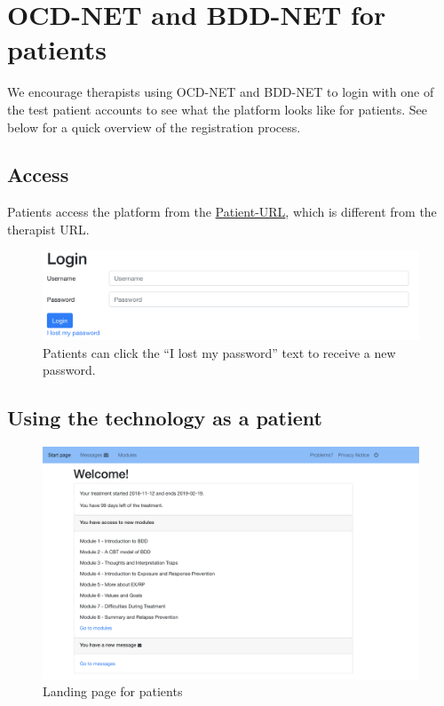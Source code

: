 \documentclass[]{book}
\theoremstyle{definition}
\theoremstyle{definition}
\theoremstyle{definition}
\theoremstyle{remark}
\begin{document}
\hypertarget{ocd-net-and-bdd-net-for-patients}{%
\section{OCD-NET and BDD-NET for
patients}\label{ocd-net-and-bdd-net-for-patients}}

We encourage therapists using OCD-NET and BDD-NET to login with one of
the test patient accounts to see what the platform looks like for
patients. See below for a quick overview of the registration process.

\hypertarget{access}{%
\subsection{Access}\label{access}}

Patients access the platform from the
\href{https://t1.webcbt.tst.ki.se/}{Patient-URL}, which is different
from the therapist URL.

\begin{figure}
\centering
\includegraphics{images/patient-login.png}
\caption{Patients can click the ``I lost my password'' text to receive a
new password.}
\end{figure}

\hypertarget{using-the-technology-as-a-patient}{%
\subsection{Using the technology as a
patient}\label{using-the-technology-as-a-patient}}

\begin{figure}
\centering
\includegraphics{images/patient-overview.png}
\caption{Landing page for patients}
\end{figure}
\end{document}
